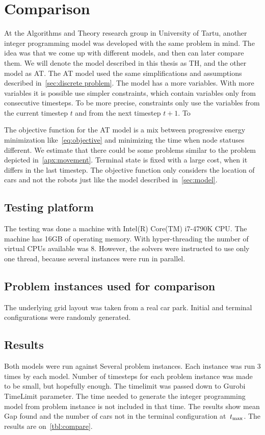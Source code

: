 \section{Comparison}
At the Algorithms and Theory research group in University of Tartu, another
integer programming model was developed with the same problem in mind. The
idea was that we come up with different models, and then can later compare
them. We will denote the model described in this thesis as TH, and the other
model as AT. The AT model used the same simplifications and assumptions described
in~\autoref{sec:discrete problem}. The model has a more variables. With more
variables it is possible use simpler constraints, which contain variables only
from consecutive timesteps. To be more precise, constraints only use the
variables from the current timestep $t$ and from the next timestep $t+1$. To

The objective function for the AT model is a mix between progressive
energy minimization like~\eqref{eq:objective} and minimizing the time when node
statuses different. We estimate that there could be some problems similar to the problem
depicted in~\autoref{apx:movement}. Terminal state is fixed with a large cost,
when it differs in the last timestep. The objective function only considers the
location of cars and not the robots just like the model described
in~\autoref{sec:model}.

\subsection{Testing platform}
The testing was done a machine with Intel(R) Core(TM) i7-4790K CPU.  The
machine has 16GB of operating memory. With hyper-threading the number of
virtual CPUs available was 8. However, the solvers were instructed to use only
one thread, because several instances were run in parallel.

\subsection{Problem instances used for comparison}
The underlying grid layout was taken from a real car park. Initial and terminal
configurations were randomly generated.

\subsection{Results}
Both models were run against Several problem instances. Each instance was run 3
times by each model. Number of timesteps for each problem instance was made to
be small, but hopefully enough. The timelimit was passed down to Gurobi
TimeLimit parameter. The time needed to generate the integer programming model
from problem instance is not included in that time. The results show mean Gap
found and the number of cars not in the terminal configuration at~$t_{\max}$. The
results are on~\autoref{tbl:compare}.

